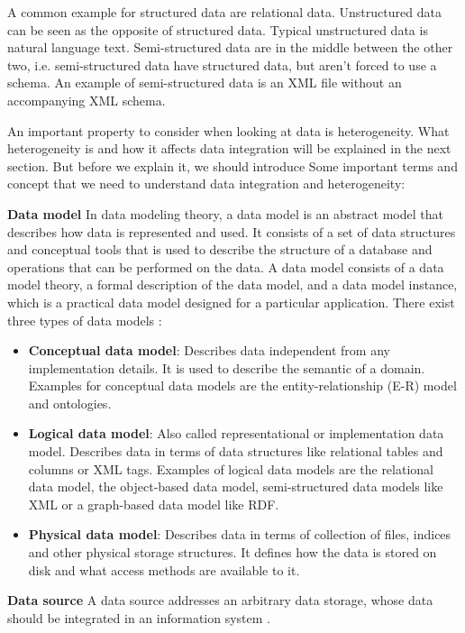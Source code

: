 A common example for structured data are relational data. Unstructured data can be seen as the opposite of structured data. Typical unstructured data is natural language text. Semi-structured data are in the middle between the other two, i.e. semi-structured data have structured data, but aren't forced to use a schema. An example of semi-structured data is an XML file without an accompanying XML schema.

An important property to consider when looking at data is heterogeneity. What heterogeneity is and how it affects data integration will be explained in the next section. But before we explain it, we should introduce Some important terms and concept that we need to understand data integration and heterogeneity:

\textbf{Data model} \label{data_model_index} In data modeling theory, a data model is an abstract model that describes how data is represented and used. It consists of a set of data structures and conceptual tools that is used to describe the structure of a database and operations that can be performed on the data. A data model consists of a data model theory, a formal description of the data model, and a data model instance, which is a practical data model designed for a particular application. There exist three types of data models \cite[p.10-14]{IntroductionToDatabaseSystems2010}:
\begin{itemize}
	\item \textbf{Conceptual data model}: Describes data independent from any implementation details. It is used to describe the semantic of a domain. Examples for conceptual data models are the entity-relationship (E-R) model and ontologies. 
	\item \textbf{Logical data model}: Also called representational or implementation data model. Describes data in terms of data structures like relational tables and columns or XML tags. Examples of logical data models are the relational data model, the object-based data model, semi-structured data models like XML or a graph-based data model like RDF. 
	\item \textbf{Physical data model}: Describes data in terms of collection of files, indices and other physical storage structures. It defines how the data is stored on disk and what access methods are available to it. 
\end{itemize}

\textbf{Data source}\label{data_source_index} A data source addresses an arbitrary data storage, whose data should be integrated in an information system \cite[p. 7]{DBLP:books/dp/LeserN2006}.

